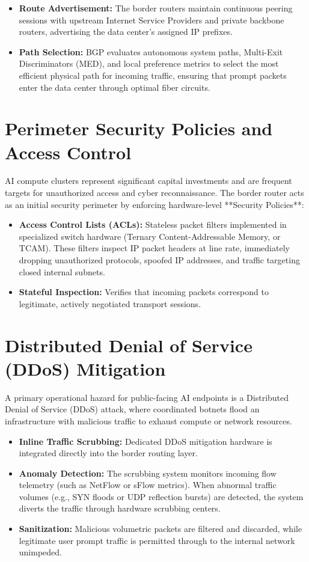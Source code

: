 \documentclass[12pt,a4paper]{report}
\begin{document}
\begin{itemize}[leftmargin=1.2cm]
    \item \textbf{Route Advertisement:} The border routers maintain continuous peering sessions with upstream Internet Service Providers and private backbone routers, advertising the data center's assigned IP prefixes.
    \item \textbf{Path Selection:} BGP evaluates autonomous system paths, Multi-Exit Discriminators (MED), and local preference metrics to select the most efficient physical path for incoming traffic, ensuring that prompt packets enter the data center through optimal fiber circuits.
\end{itemize}

\section{Perimeter Security Policies and Access Control}
AI compute clusters represent significant capital investments and are frequent targets for unauthorized access and cyber reconnaissance. The border router acts as an initial security perimeter by enforcing hardware-level **Security Policies**:
\begin{itemize}[leftmargin=1.2cm]
    \item \textbf{Access Control Lists (ACLs):} Stateless packet filters implemented in specialized switch hardware (Ternary Content-Addressable Memory, or TCAM). These filters inspect IP packet headers at line rate, immediately dropping unauthorized protocols, spoofed IP addresses, and traffic targeting closed internal subnets.
    \item \textbf{Stateful Inspection:} Verifies that incoming packets correspond to legitimate, actively negotiated transport sessions.
\end{itemize}

\section{Distributed Denial of Service (DDoS) Mitigation}
A primary operational hazard for public-facing AI endpoints is a Distributed Denial of Service (DDoS) attack, where coordinated botnets flood an infrastructure with malicious traffic to exhaust compute or network resources.

\begin{itemize}[leftmargin=1.2cm]
    \item \textbf{Inline Traffic Scrubbing:} Dedicated DDoS mitigation hardware is integrated directly into the border routing layer.
    \item \textbf{Anomaly Detection:} The scrubbing system monitors incoming flow telemetry (such as NetFlow or sFlow metrics). When abnormal traffic volumes (e.g., SYN floods or UDP reflection bursts) are detected, the system diverts the traffic through hardware scrubbing centers.
    \item \textbf{Sanitization:} Malicious volumetric packets are filtered and discarded, while legitimate user prompt traffic is permitted through to the internal network unimpeded.
\end{itemize}
\end{document}
